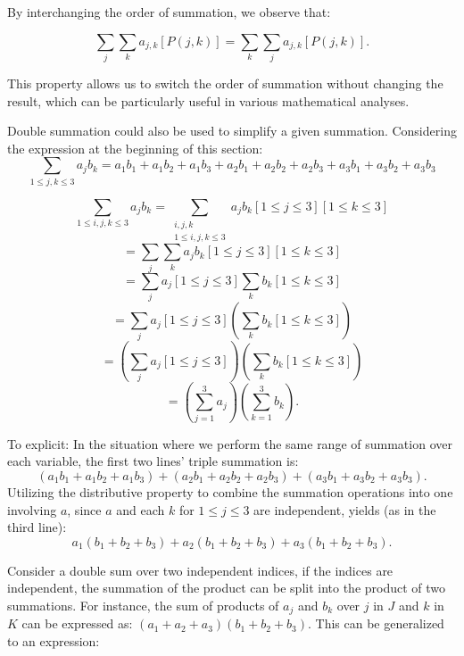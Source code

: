 \documentclass[
	12pt, %
	fleqn, %
	a4paper, %
]{LegrandOrangeBook}
\begin{document}
By interchanging the order of summation, we observe that:

\begin{equation}
\sum_{j}\sum_{k} a_{j,k} [P(j,k)] = \sum_{k}\sum_{j} a_{j,k} [P(j,k)].
\end{equation}

This property allows us to switch the order of summation without changing the result, which can be particularly useful in various mathematical analyses.

Double summation could also be used to simplify a given summation.
Considering the expression at the beginning of this section:
$$\sum_{1 \leq j, k \leq 3} a_j b_k = a_1b_1 + a_1b_2 + a_1b_3 + a_2b_1 + a_2b_2 + a_2b_3 + a_3b_1 + a_3b_2 + a_3b_3 $$

\begin{example}
    \[
\sum_{1 \leq i,j,k \leq 3} a_j b_k = \sum_{\substack{i,j,k \\ 1 \leq i,j,k \leq 3}} a_j b_k \left[1 \leq j \leq 3\right] \left[1 \leq k \leq 3\right]
\]
\[
= \sum_j \sum_k a_j b_k \left[1 \leq j \leq 3\right] \left[1 \leq k \leq 3\right]
\]
\[
= \sum_j a_j \left[1 \leq j \leq 3\right] \sum_k b_k \left[1 \leq k \leq 3\right]
\]
\[
= \sum_j a_j \left[1 \leq j \leq 3\right] \left( \sum_k b_k \left[1 \leq k \leq 3\right] \right)
\]
\[
= \left( \sum_j a_j \left[1 \leq j \leq 3\right] \right) \left( \sum_k b_k \left[1 \leq k \leq 3\right] \right)
\]
\[
= \left( \sum_{j=1}^3 a_j \right) \left( \sum_{k=1}^3 b_k \right).
    \]

\end{example}
To explicit:
In the situation where we perform the same range of summation over each variable, the first two lines' triple summation is:
\[
(a_1b_1 + a_1b_2 + a_1b_3) + (a_2b_1 + a_2b_2 + a_2b_3) + (a_3b_1 + a_3b_2 + a_3b_3).
\]
Utilizing the distributive property to combine the summation operations into one involving \( a \), since \( a \) and each \( k \) for \( 1 \leq j \leq 3 \) are independent, yields (as in the third line):
\[
a_1(b_1 + b_2 + b_3) + a_2(b_1 + b_2 + b_3) + a_3(b_1 + b_2 + b_3).
\]

Consider a double sum over two independent indices, if the indices are independent, the summation of the product can be split into the product of two summations. For instance, the sum of products of \(a_j\) and \(b_k\) over \(j\) in \(J\) and \(k\) in \(K\) can be expressed as: \( (a_1 + a_2 + a_3)(b_1 + b_2 + b_3) \). This can be generalized to an expression:
\end{document}
